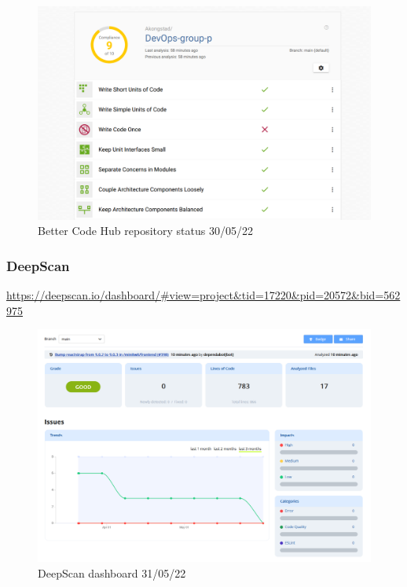 \begin {figure}[H]
    \centering
    \includegraphics[scale=0.45]{images/analysis_tools/analysis 9of10.PNG}
    \caption{Better Code Hub repository status 30/05/22}
    \label{fig:hubStatus}
\end{figure}


\subsubsection{DeepScan}
\label{app:codeAnalDeep}
\href{https://deepscan.io/dashboard/\#view=project\&tid=17220\&pid=20572\&bid=562975}{https://deepscan.io/dashboard/\#view=project\&tid=17220\&pid=20572\&bid=562975}
\begin {figure}[H]
    \centering
    \includegraphics[scale=0.40]{images/analysis_tools/deepscan.PNG}
    \caption{DeepScan dashboard 31/05/22}
    \label{fig:deepscan}
\end{figure}

